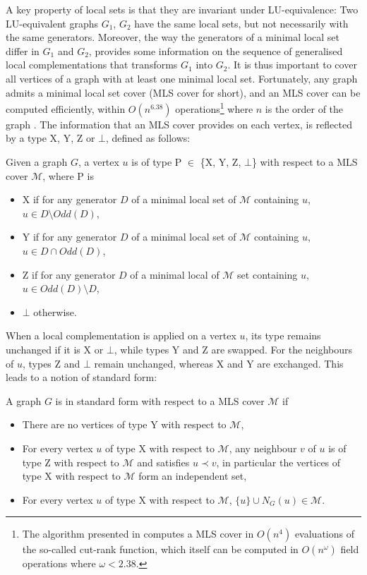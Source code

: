 \documentclass[a4paper,UKenglish,cleveref,autoref,thm-restate]{arxiv}
\newcommand{\sm}{\setminus}
\begin{document}
A key property of local sets is that they are invariant under LU-equivalence: Two LU-equivalent graphs $G_1$, $G_2$ have the same local sets, but not necessarily with the same generators. Moreover, the way the generators of a minimal local set differ in $G_1$ and $G_2$, 
provides some information on the sequence of generalised local complementations that transforms $G_1$ into $G_2$. 
It is thus important to cover all vertices of a graph with at least one minimal local set. Fortunately, any graph admits a minimal local set cover (MLS cover for short), and an MLS cover can be computed efficiently, within   $O(n^{6.38})$ operations\footnote{The algorithm presented in \cite{claudet2024covering} computes a MLS cover in $O(n^4)$ evaluations of the so-called cut-rank function, which itself can be computed in $O(n^\omega)$ field operations where $\omega < 2.38$.} where $n$ is the order of the graph \cite{claudet2024covering}. The information that an MLS cover provides on each vertex, is reflected by a type X, Y, Z or $\bot$, defined as follows:


\begin{definition} \label{def:type}Given a graph $G$, a vertex $u$ is of type P $\in$ \{X, Y, Z, $\bot$\} with respect to a MLS cover $\mathcal M$, where P is
    \begin{itemize}
        \item  X if for any generator $D$ of a minimal local set of $\mathcal M$ containing $u$, $u\in D \sm Odd(D)$,
        \item  Y if for any generator $D$ of a minimal local set of $\mathcal M$ containing $u$, $u\in D \cap Odd(D)$, 
        \item Z if for any generator $D$ of a minimal local of $\mathcal M$ set containing $u$, $u\in Odd(D) \sm D$, 
        \item $\bot$ otherwise. 
    \end{itemize}
    \end{definition}
        
When a local complementation is applied on a vertex $u$, its type remains unchanged if it is X or $\bot$, while types Y and Z are swapped. For the neighbours of $u$, types Z and  $\bot$ remain unchanged, whereas  X and  Y are exchanged. This leads to a notion of standard form: 
    

\begin{definition}
    A graph $G$ is in standard form with respect to a MLS cover $\mathcal M$ if
    \begin{itemize}
        \item There are no vertices of type Y with respect to $\mathcal M$,
        \item For every vertex $u$ of type X with respect to $\mathcal M$, any neighbour $v$ of $u$ is of type Z with respect to $\mathcal M$ and satisfies $u\prec v$, in particular the vertices of type X with respect to $\mathcal M$ form an independent set,
        \item For every vertex $u$ of type X with respect to $\mathcal M$, $\{u\} \cup N_G(u) \in \mathcal M$.
    \end{itemize}
\end{definition}
\end{document}
